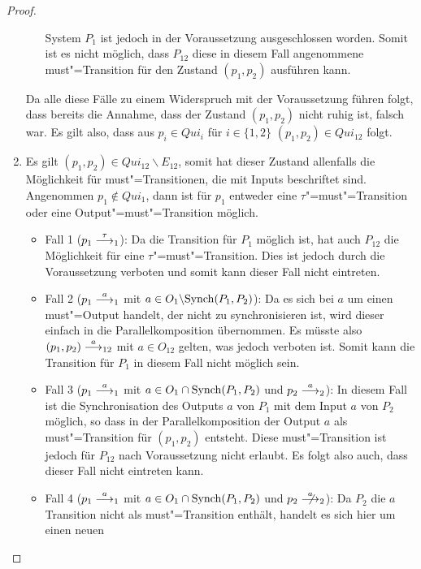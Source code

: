 \begin{proof}
\begin{enumerate}
\begin{itemize}
          System $P_1$ ist jedoch in der Voraussetzung ausgeschlossen worden.
          Somit ist es nicht möglich, dass $P_{12}$ diese in diesem Fall
          angenommene must"=Transition für den Zustand $(p_1,p_2)$ ausführen
          kann.
      \end{itemize}
      Da alle diese Fälle zu einem Widerspruch mit der Voraussetzung führen
      folgt, dass bereits die Annahme, dass der Zustand $(p_1,p_2)$ nicht ruhig
      ist, falsch war. Es gilt also, dass aus $p_i\in Qui_i$ für $i\in\{1,2\}$
      $(p_1,p_2)\in Qui_{12}$ folgt.
    \item Es gilt $(p_1,p_2)\in Qui_{12}\backslash E_{12}$, somit hat dieser
      Zustand allenfalls die Möglichkeit für must"=Transitionen, die mit Inputs
      beschriftet sind.\\
      Angenommen $p_1\notin Qui _1$, dann ist für $p_1$ entweder eine
      $\tau$"=must"=Transition oder eine Output"=must"=Transition möglich.
      \begin{itemize}
        \item Fall 1 \big($p_1\must[\tau]_1$\big): Da die Transition für $P_1$
          möglich ist, hat auch $P_{12}$ die Möglichkeit für eine
          $\tau$"=must"=Transition. Dies ist jedoch durch die Voraussetzung
          verboten und somit kann dieser Fall nicht eintreten.
        \item Fall 2 \big($p_1\must[a]_1$ mit $a\in O_1\backslash
          \mathrm{Synch}(P_1,P_2)$\big): Da es sich bei $a$ um einen must"=Output
          handelt, der nicht zu synchronisieren ist, wird dieser einfach in die
          Parallelkomposition übernommen. Es müsste also $(p_1,p_2)
          \must[a]_{12}$ mit $a\in O_{12}$ gelten, was jedoch verboten ist.
          Somit kann die Transition für $P_1$ in diesem Fall nicht möglich
          sein.
        \item Fall 3 \big($p_1\must[a]_1$ mit $a\in O_1\cap\mathrm{Synch}(P_1,P_2)$ und
          $p_2\must[a]_2$\big): In diesem Fall ist die Synchronisation des
          Outputs $a$ von $P_1$ mit dem Input $a$ von $P_2$ möglich, so dass in
          der Parallelkomposition der Output $a$ als must"=Transition für
          $(p_1,p_2)$ entsteht. Diese must"=Transition ist jedoch für $P_{12}$
          nach Voraussetzung nicht erlaubt. Es folgt also auch, dass dieser
          Fall nicht eintreten kann.
        \item Fall 4 \big($p_1\must[a]_1$ mit $a\in O_1\cap\mathrm{Synch}(P_1,P_2)$ und
          $p_2\nmust[a]_2$\big): Da $P_2$ die $a$ Transition nicht als
          must"=Transition enthält, handelt es sich hier um einen neuen

\end{itemize}
\end{enumerate}
\end{proof}
